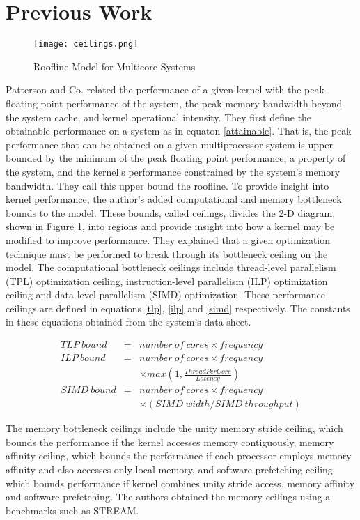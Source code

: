 \documentclass[dvips,12pt]{article}
\begin{document}
\section{Previous Work}
\begin{figure}[h]
\centering
\texttt{[image: ceilings.png]}
\caption{Roofline Model for Multicore Systems}
\label{2dmodel}
\end{figure} 
Patterson and Co.\cite{rfline09} related the performance of a given kernel with the peak floating point performance of the system, the peak memory bandwidth beyond the system cache, and kernel operational intensity. They first define the obtainable performance on a system as in equaton \ref{attainable}. That is, the peak performance that can be obtained on a given multiprocessor system is upper bounded by the minimum of the peak floating point performance, a property of the system, and the kernel's performance constrained by the system's memory bandwidth. They call this upper bound the roofline. To provide insight into kernel performance, the author's added computational and memory bottleneck bounds to the model. These bounds, called ceilings, divides the 2-D diagram, shown in Figure \ref{2dmodel}, into regions and provide insight into how a kernel may be modified to improve performance. They explained that a given optimization technique must be performed to break through its bottleneck ceiling on the model. The computational bottleneck ceilings include thread-level parallelism (TPL) optimization ceiling, instruction-level parallelism (ILP) optimization ceiling and data-level parallelism (SIMD) optimization. These performance ceilings are defined in equations \ref{tlp}, \ref{ilp} and \ref{simd} respectively. The constants in these equations obtained from the system's data sheet.

\begin{eqnarray}
TLP \: bound &=& number \: of \: cores \times frequency \label{tlp} \\
ILP \: bound &=& number \: of \: cores \times frequency \nonumber \\
             & & \times max \left(1, \frac{ThreadPerCore}{Latency} \right) \label{ilp} \\
SIMD \: bound &=& number \: of \: cores \times frequency \nonumber \\ 
             & & \times \left(SIMD \: width/SIMD \: throughput \right) \label{simd}
\end{eqnarray}

The memory bottleneck ceilings include the unity memory stride ceiling, which bounds the performance if the kernel accesses memory contiguously, memory affinity ceiling, which bounds the performance if each processor employs memory affinity and also accesses only local memory, and software prefetching ceiling which bounds performance if kernel combines unity stride access, memory affinity and software prefetching. The authors obtained the memory ceilings using a benchmarks such as STREAM.
\end{document}
